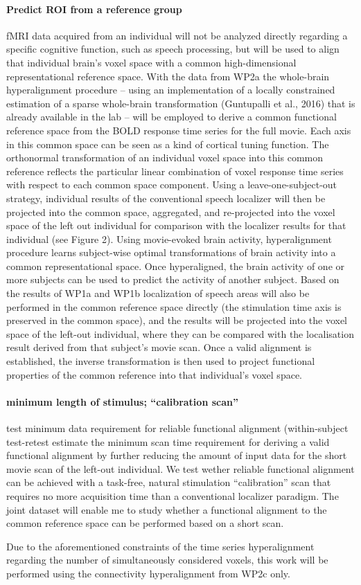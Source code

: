 \paragraph{Predict ROI from a reference group}
%
fMRI data acquired from an individual will not be analyzed directly regarding a
specific cognitive function, such as speech processing, but will be used to
align that individual brain's voxel space with a common high-dimensional
representational reference space.
%
With the data from WP2a the whole-brain hyperalignment procedure -- using an
implementation of a locally constrained estimation of a sparse whole-brain
transformation (Guntupalli et al., 2016) that is already available in the lab --
will be employed to derive a common functional reference space from the BOLD
response time series for the full movie.
%
Each axis in this common space can be seen as a kind of cortical tuning
function.
%
The orthonormal transformation of an individual voxel space into this common
reference reflects the particular linear combination of voxel response time
series with respect to each common space component.
%
Using a leave-one-subject-out strategy, individual results of the conventional
speech localizer will then be projected into the common space, aggregated, and
re-projected into the voxel space of the left out individual for comparison with
the localizer results for that individual (see Figure 2).
%
Using movie-evoked brain activity, hyperalignment procedure learns subject-wise
optimal transformations of brain activity into a common representational space.
%
Once hyperaligned, the brain activity of one or more subjects can be used to
predict the activity of another subject.
%
Based on the results of WP1a and WP1b localization of speech areas will also be
performed in the common reference space directly (the stimulation time axis is
preserved in the common space), and the results will be projected into the voxel
space of the left-out individual, where they can be compared with the
localisation result derived from that subject’s movie scan.
%
Once a valid alignment is established, the inverse transformation is then used
to project functional properties of the common reference into that individual's
voxel space.


\paragraph{minimum length of stimulus; ``calibration scan''}

%
test minimum data requirement for reliable functional alignment (within-subject
test-retest
%
estimate the minimum scan time requirement for deriving a valid functional
alignment by further reducing the amount of input data for the short movie scan
of the left-out individual.
%
We test wether reliable functional alignment can be achieved with a task-free,
natural stimulation ``calibration” scan that requires no more acquisition time
than a conventional localizer paradigm.
%
The joint dataset will enable me to study whether a functional alignment to the
common reference space can be performed based on a short scan.

%
Due to the aforementioned constraints of the time series hyperalignment
regarding the number of simultaneously considered voxels, this work will be
performed using the connectivity hyperalignment from WP2c only.
